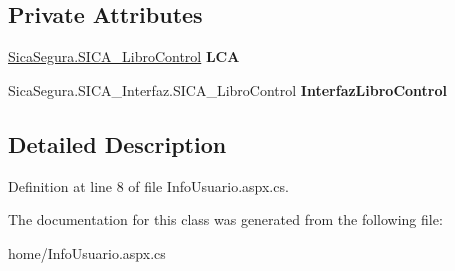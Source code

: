 \subsection*{Private Attributes}
\begin{DoxyCompactItemize}
\item 
\hyperlink{class_sica_segura_1_1_s_i_c_a___libro_control}{Sica\+Segura.\+S\+I\+C\+A\+\_\+\+Libro\+Control} {\bfseries L\+CA}\hypertarget{classlibrodigital__home___info_usuario_af75ca2238efad682fca81648b84a577e}{}\label{classlibrodigital__home___info_usuario_af75ca2238efad682fca81648b84a577e}

\item 
Sica\+Segura.\+S\+I\+C\+A\+\_\+\+Interfaz.\+S\+I\+C\+A\+\_\+\+Libro\+Control {\bfseries Interfaz\+Libro\+Control}\hypertarget{classlibrodigital__home___info_usuario_ad194a226993d9afcdf6685a3c38ac232}{}\label{classlibrodigital__home___info_usuario_ad194a226993d9afcdf6685a3c38ac232}

\end{DoxyCompactItemize}


\subsection{Detailed Description}


Definition at line 8 of file Info\+Usuario.\+aspx.\+cs.



The documentation for this class was generated from the following file\+:\begin{DoxyCompactItemize}
\item 
home/Info\+Usuario.\+aspx.\+cs\end{DoxyCompactItemize}
